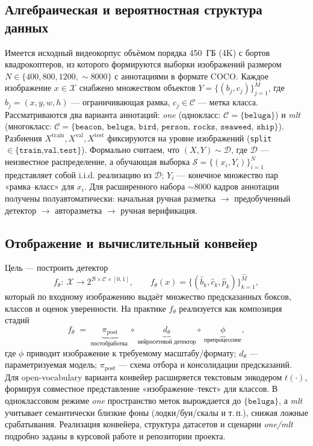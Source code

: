 \documentclass{article}
\begin{document}
\subsection{Алгебраическая и вероятностная структура данных}
Имеется исходный видеокорпус объёмом порядка 450~ГБ (4K) с бортов квадрокоптеров, из которого формируются выборки изображений размером $N\in\{400,800,1200,\sim 8000\}$ с аннотациями в формате COCO. Каждое изображение $x\in\mathcal{X}$ снабжено множеством объектов $Y=\{(b_j,c_j)\}_{j=1}^{M}$, где $b_j=(x,y,w,h)$ — ограничивающая рамка, $c_j\in\mathcal{C}$ — метка класса. Рассматриваются два варианта аннотаций: \textit{one} (однокласс: $\mathcal{C}=\{\texttt{beluga}\}$) и \textit{mlt} (многокласс: $\mathcal{C}=\{\texttt{beacon, beluga, bird, person, rocks, seaweed, ship}\}$). Разбиения $X^{\mathrm{train}},X^{\mathrm{val}},X^{\mathrm{test}}$ фиксируются на уровне изображений (\texttt{split}$\in\{\texttt{train,val,test}\}$). Формально считаем, что $(X,Y)\sim \mathcal{D}$, где $\mathcal{D}$ — неизвестное распределение, а обучающая выборка $\mathcal{S}=\{(x_i, Y_i)\}_{i=1}^{N}$ представляет собой i.i.d. реализацию из $\mathcal{D}$; $Y_i$ — конечное множество пар «рамка–класс» для $x_i$. Для расширенного набора $\sim 8000$ кадров аннотации получены полуавтоматически: начальная ручная разметка $\to$ предобученный детектор $\to$ авторазметка $\to$ ручная верификация.

\subsection{Отображение и вычислительный конвейер}
Цель — построить детектор
\[
f_\theta:\ \mathcal{X}\to 2^{\mathcal{B}\times\mathcal{C}\times[0,1]},\qquad
f_\theta(x)=\{(\hat b_k,\hat c_k,\hat p_k)\}_{k=1}^{\hat M},
\]
который по входному изображению выдаёт множество предсказанных боксов, классов и оценок уверенности. На практике $f_\theta$ реализуется как композиция стадий
\[
f_\theta \;=\; \underbrace{\pi_{\text{post}}}_{\text{постобработка }} \circ\ 
\underbrace{d_\theta}_{\text{нейросетевой детектор}}\circ\ 
\underbrace{\phi}_{\text{препроцессинг}},
\]
где $\phi$ приводит изображение к требуемому масштабу/формату; $d_\theta$ — параметризуемая модель; $\pi_{\text{post}}$ — схема отбора и консолидации предсказаний. Для open-vocabulary варианта конвейер расширяется текстовым энкодером $t(\cdot)$, формируя совместное представление «изображение–текст» для классов. В одноклассовом режиме \textit{one} пространство меток вырождается до $\{\texttt{beluga}\}$, а \textit{mlt} учитывает семантически близкие фоны (лодки/буи/скалы и т.\,п.), снижая ложные срабатывания. Реализация конвейера, структура датасетов и сценарии \textit{one/mlt} подробно заданы в курсовой работе и репозитории проекта.
\end{document}
